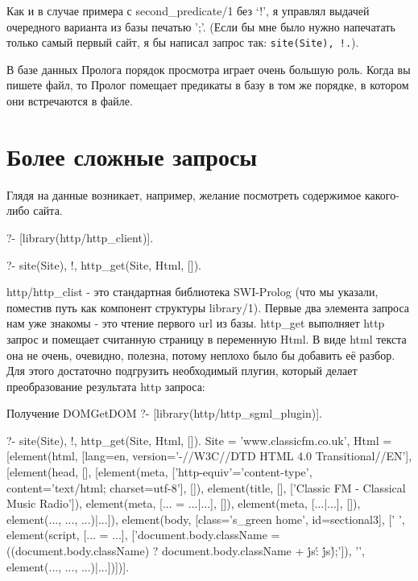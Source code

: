 \documentclass[a4paper]{book}
\begin{document}
Как и в случае примера с second_predicate/1 без `!', я управлял
выдачей очередного варианта из базы печатью ';'. (Если бы мне
было нужно напечатать только самый первый сайт, я бы написал
запрос так: \verb|site(Site), !.|). 

В базе данных Пролога порядок просмотра играет очень большую
роль. Когда вы пишете файл, то Пролог помещает предикаты в базу в
том же порядке, в котором они встречаются в файле.

\section{Более сложные запросы}

Глядя на данные возникает, например, желание посмотреть
содержимое какого-либо сайта.

\begin{example}{}{}
?- [library(http/http_client)].

?- site(Site), !, http_get(Site, Html, []).
\end{example}

http/http_clist - это стандартная библиотека SWI-Prolog (что мы
указали, поместив путь как компонент структуры library/1). Первые
два элемента запроса нам уже знакомы - это чтение первого url из
базы.  http_get выполняет http запрос и помещает считанную
страницу в переменную Html. В виде html текста она не очень,
очевидно, полезна, потому неплохо было бы добавить её разбор. Для
этого достаточно подгрузить необходимый плугин, который делает
преобразование результата http запроса:

\begin{example}{Получение DOM}{GetDOM}
?- [library(http/http_sgml_plugin)].                  

?- site(Site), !, http_get(Site, Html, []).
Site = 'www.classicfm.co.uk',
Html = [element(html, [lang=en, version='-//W3C//DTD HTML 4.0 Transitional//EN'], [element(head, [], [element(meta, ['http-equiv'='content-type', content='text/html; charset=utf-8'], []), element(title, [], ['Classic FM - Classical Music Radio']), element(meta, [... = ...|...], []), element(meta, [...|...], []), element(..., ..., ...)|...]), element(body, [class='s_green home', id=sectional3], ['    ', element(script, [... = ...], ['document.body.className = ((document.body.className) ? document.body.className + \'js\' : \'js\');']), '\n    \n    \n    ', element(..., ..., ...)|...])])].                                                      
\end{example}
\end{document}
